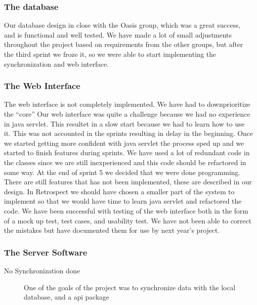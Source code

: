 \subsubsection*{The database}
Our database design in close with the Oasis group, which was a great success, and is functional and well tested. We have made a lot of small adjustments throughout the project based on requirements from the other groups, but after the third sprint we froze it, so we were able to start implementing the synchronization and web interface.

\subsubsection*{The Web Interface}
The web interface is not completely implemented. We have had to downprioritize the ``core''
Our web interface was quite a challenge because we had no experience in java servlet. This resultet in a slow start because we had to learn how to use it. This was not accounted in the sprints resulting in delay in the beginning. Once we started getting more confident with java servlet the process sped up and we started to finish features during sprints.
We have used a lot of redundant code in the classes since we are still inexperienced and this code should be refactored in some way. At the end of sprint 5 we decided that we were done programming. There are still features that has not been implemented, these are described in our design.
In Retrospect we should have chosen a smaller part of the system to implement so that we would have time to learn java servlet and refactored the code. We have been successful with testing of the web interface both in the form of a mock up test, test cases, and usability test.
We have not been able to correct the mistakes but have documented them for use by next year's project.

\subsubsection*{The Server Software}
\begin{description}
 \item[No Synchronization done] One of the goals of the project was to synchronize data with the local database, and a api package 
\end{description}


